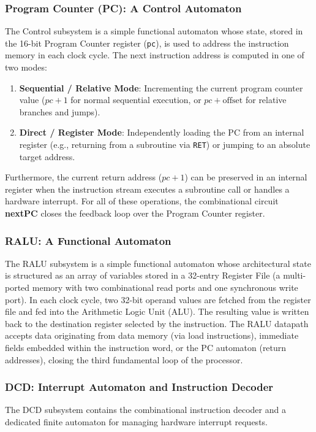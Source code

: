 \subsubsection{Program Counter (PC): A Control Automaton}
The Control subsystem is a simple functional automaton whose state, stored in the 16-bit Program Counter register (\texttt{pc}), is used to address the instruction memory in each clock cycle. The next instruction address is computed in one of two modes:
\begin{enumerate}
    \item \textbf{Sequential / Relative Mode}: Incrementing the current program counter value ($pc + 1$ for normal sequential execution, or $pc + \text{offset}$ for relative branches and jumps).
    \item \textbf{Direct / Register Mode}: Independently loading the PC from an internal register (e.g., returning from a subroutine via \texttt{RET}) or jumping to an absolute target address.
\end{enumerate}
Furthermore, the current return address ($pc + 1$) can be preserved in an internal register when the instruction stream executes a subroutine call or handles a hardware interrupt. For all of these operations, the combinational circuit \textbf{nextPC} closes the feedback loop over the Program Counter register.

\subsubsection{RALU: A Functional Automaton}
The RALU subsystem is a simple functional automaton whose architectural state is structured as an array of variables stored in a 32-entry Register File (a multi-ported memory with two combinational read ports and one synchronous write port). In each clock cycle, two 32-bit operand values are fetched from the register file and fed into the Arithmetic Logic Unit (ALU). The resulting value is written back to the destination register selected by the instruction. The RALU datapath accepts data originating from data memory (via load instructions), immediate fields embedded within the instruction word, or the PC automaton (return addresses), closing the third fundamental loop of the processor.

\subsubsection{DCD: Interrupt Automaton and Instruction Decoder}\label{interrupt}
The DCD subsystem contains the combinational instruction decoder and a dedicated finite automaton for managing hardware interrupt requests.

